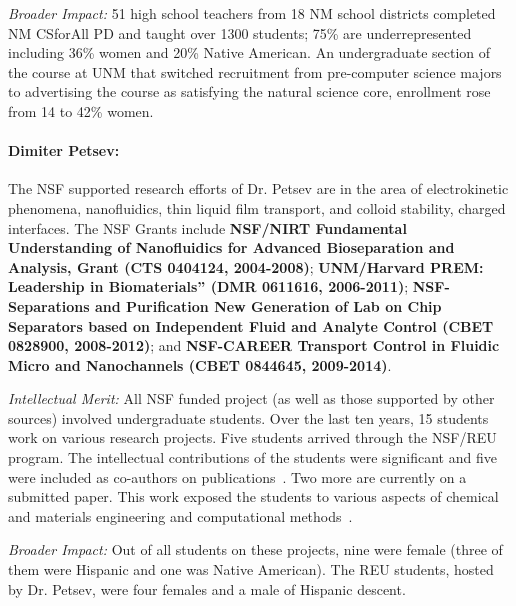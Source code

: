 \noindent \textit{Broader Impact:}
51 high school teachers from 18 NM school districts completed NM CSforAll PD and taught over 1300 students; 75\% are underrepresented including 36\% women and 20\% Native American. An undergraduate section of the course at UNM that switched recruitment from pre-computer science majors to advertising the course as satisfying the natural science core, enrollment rose from 14 to 42\% women. 

\paragraph{Dimiter Petsev:}
The NSF supported research efforts of Dr. Petsev are in the area of electrokinetic phenomena, nanofluidics, thin liquid film transport, and colloid stability, charged interfaces. The NSF Grants include \textbf{NSF/NIRT Fundamental Understanding of Nanofluidics for Advanced Bioseparation and Analysis, Grant (CTS 0404124, 2004-2008)}; \textbf{UNM/Harvard PREM: Leadership in Biomaterials” (DMR 0611616, 2006-2011)}; \textbf{NSF-Separations and Purification New Generation of Lab on Chip Separators based on Independent Fluid and Analyte Control (CBET 0828900, 2008-2012)}; and \textbf{NSF-CAREER Transport Control in Fluidic Micro and Nanochannels (CBET 0844645, 2009-2014)}.

\noindent\textit{Intellectual Merit:} All NSF funded project (as well as those supported by other sources) involved undergraduate students. Over the last ten years, 15 students work on various research projects. Five students arrived through the NSF/REU program. The intellectual contributions of the students were significant and five were included as co-authors on publications~\cite{petsev1,petsev2,petsev3,petsev4,petsev5,petsev5}. Two more are currently on a submitted paper. This work exposed the students to various aspects of chemical and materials engineering and computational methods~\cite{petsev7}.

\noindent\textit{Broader Impact:} Out of all students on these projects, nine were female (three of them were Hispanic and one was Native American). The REU students, hosted by Dr. Petsev, were four females and a male of Hispanic descent.    

